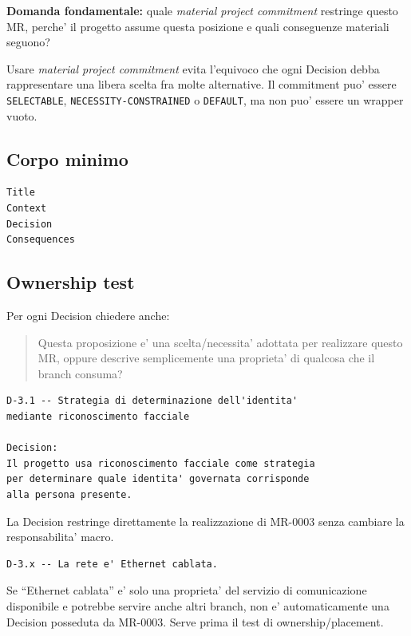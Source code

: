 \documentclass[11pt,a4paper]{article}
\newcommand{\code}[1]{\texttt{#1}}
\begin{document}
\begin{statusclosed}
\textbf{Domanda fondamentale:} quale \emph{material project commitment} restringe questo MR, perche' il progetto assume questa posizione e quali conseguenze materiali seguono?
\end{statusclosed}

Usare \emph{material project commitment} evita l'equivoco che ogni Decision debba rappresentare una libera scelta fra molte alternative. Il commitment puo' essere \code{SELECTABLE}, \code{NECESSITY-CONSTRAINED} o \code{DEFAULT}, ma non puo' essere un wrapper vuoto.

\subsection{Corpo minimo}

\begin{lstlisting}
Title
Context
Decision
Consequences
\end{lstlisting}

\subsection{Ownership test}

Per ogni Decision chiedere anche:

\begin{quote}
Questa proposizione e' una scelta/necessita' adottata per realizzare questo MR, oppure descrive semplicemente una proprieta' di qualcosa che il branch consuma?
\end{quote}

\begin{goodbox}
\begin{lstlisting}
D-3.1 -- Strategia di determinazione dell'identita'
mediante riconoscimento facciale

Decision:
Il progetto usa riconoscimento facciale come strategia
per determinare quale identita' governata corrisponde
alla persona presente.
\end{lstlisting}
La Decision restringe direttamente la realizzazione di MR-0003 senza cambiare la responsabilita' macro.
\end{goodbox}

\begin{badbox}
\begin{lstlisting}
D-3.x -- La rete e' Ethernet cablata.
\end{lstlisting}
Se ``Ethernet cablata'' e' solo una proprieta' del servizio di comunicazione disponibile e potrebbe servire anche altri branch, non e' automaticamente una Decision posseduta da MR-0003. Serve prima il test di ownership/placement.
\end{badbox}
\end{document}
